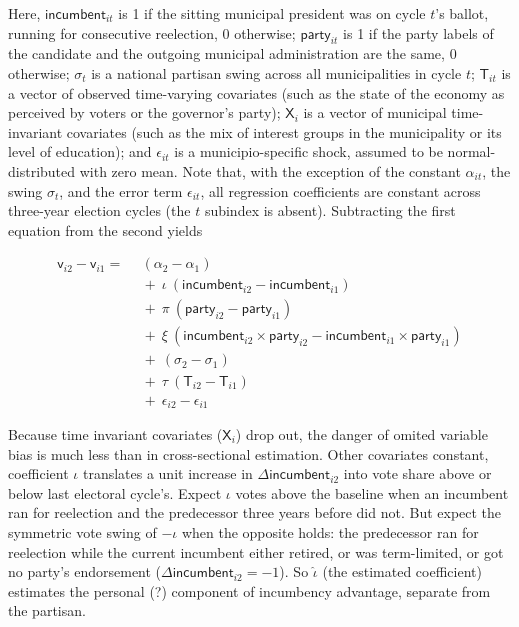 \documentclass[letter,12pt]{article}
\newcommand{\vn}[1]{\vnform{#1}}      %
\newcommand{\vnform}[1]{\mathsf{#1}}  %
\begin{document}
\noindent Here, $\vn{incumbent}_{it}$ is 1 if the sitting municipal president was on cycle $t$'s ballot, running for consecutive reelection, 0 otherwise; $\vn{party}_{it}$ is 1 if the party labels of the candidate and the outgoing municipal administration are the same, 0 otherwise; $\sigma_t$ is a national partisan swing across all municipalities in cycle $t$; $\vn{T}_{it}$ is a vector of observed time-varying covariates (such as the state of the economy as perceived by voters or the governor's party); $\vn{X}_i$ is a vector of municipal time-invariant covariates (such as the mix of interest groups in the municipality or its level of education); and $\epsilon_{it}$ is a municipio-specific shock, assumed to be normal-distributed with zero mean. Note that, with the exception of the constant $\alpha_{it}$, the swing $\sigma_t$, and the error term $\epsilon_{it}$, all regression coefficients are constant across three-year election cycles (the $t$ subindex is absent). Subtracting the first equation from the second yields

\begin{equation}
\begin{split}
  \vn{v}_{i2} - \vn{v}_{i1} =  & ~~(\alpha_2 - \alpha_1) \\
                               & ~~+~\iota~(\vn{incumbent}_{i2} - \vn{incumbent}_{i1}) \\
                               & ~~+~\pi~(\vn{party}_{i2} - \vn{party}_{i1}) \\
                               & ~~+~\xi~(\vn{incumbent}_{i2} \times \vn{party}_{i2} - \vn{incumbent}_{i1} \times \vn{party}_{i1}) \\
                               & ~~+~(\sigma_2 - \sigma_1) \\
                               & ~~+~\tau~(\vn{T}_{i2} - \vn{T}_{i1}) \\
                               & ~~+~\epsilon_{i2} - \epsilon_{i1}
\end{split}
\end{equation}

\noindent Because time invariant covariates ($\vn{X}_i$) drop out, the danger of omited variable bias is much less than in cross-sectional estimation. Other covariates constant, coefficient $\iota$ translates a unit increase in $\Delta \vn{incumbent}_{i2}$ into vote share above or below last electoral cycle's. Expect $\iota$ votes above the baseline when an incumbent ran for reelection and the predecessor three years before did not. But expect the symmetric vote swing of $-\iota$ when the opposite holds: the predecessor ran for reelection while the current incumbent either retired, or was term-limited, or got no party's endorsement ($\Delta \vn{incumbent}_{i2}=-1$). So $\hat{\iota}$ (the estimated coefficient) estimates the personal (?) component of incumbency advantage, separate from the partisan.
\end{document}
